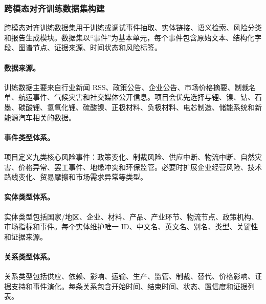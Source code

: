 ﻿\documentclass[12pt,a4paper]{article}
\begin{document}
\subsubsection{跨模态对齐训练数据集构建}

跨模态对齐训练数据集用于训练或调试事件抽取、实体链接、语义检索、风险分类和报告生成模块。数据集以“事件”为基本单元，每个事件包含原始文本、结构化字段、图谱节点、证据来源、时间状态和风险标签。

\paragraph{数据来源。}训练数据主要来自行业新闻 RSS、政策公告、企业公告、市场价格摘要、制裁名单、航运事件、气候灾害和社交媒体公开信息。项目会优先选择与锂、镍、钴、石墨、碳酸锂、氢氧化锂、硫酸镍、正极材料、负极材料、电芯制造、储能系统和新能源汽车相关的数据。

\paragraph{事件类型体系。}项目定义九类核心风险事件：政策变化、制裁风险、供应中断、物流中断、自然灾害、价格异常、罢工事件、地缘冲突和环保监管。必要时扩展企业经营风险、技术路线变化、贸易摩擦和市场需求异常等类型。

\paragraph{实体类型体系。}实体类型包括国家/地区、企业、材料、产品、产业环节、物流节点、政策机构、市场指标和事件。每个实体维护唯一 ID、中文名、英文名、别名、类型、关键性和证据来源。

\paragraph{关系类型体系。}关系类型包括供应、依赖、影响、运输、生产、监管、制裁、替代、价格影响、证据支持和事件演化。每条关系包含开始时间、结束时间、状态、置信度和证据列表。
\end{document}
